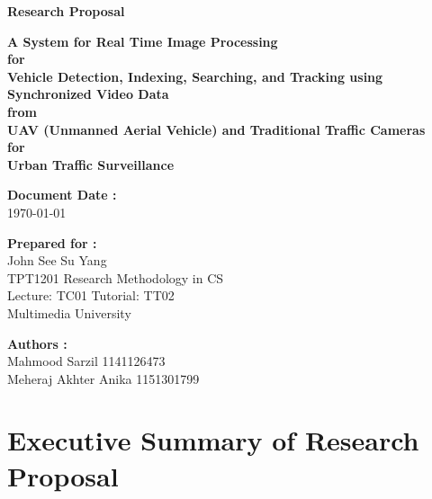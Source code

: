 \documentclass[12pt,a4paper,oneside]{article}
\begin{document}
 


\begin{titlepage}
	\null \vfill
   \begin{center}
    {\LARGE \textbf{Research Proposal}}
			\vspace{20mm}
			
			
			
			{\Large  \textbf{A System for Real Time Image Processing \\for 
            	\\Vehicle Detection, Indexing, Searching, and Tracking using 						Synchronized Video Data \\from \\UAV (Unmanned Aerial Vehicle)  and 				Traditional Traffic Cameras \\for \\Urban Traffic Surveillance }}
			\vspace{8mm}
			
			
   \end{center}
  	\vfill
		\vfill
		
		\begin{flushright}
			
			\textbf{Document Date :}\\
			\today
			\vspace{7mm}
			
			\textbf{Prepared for :}\\
            {\large John See Su Yang\\}
            TPT1201 Research Methodology in CS\\
            Lecture: TC01 Tutorial: TT02\\ 
            Multimedia University 
			\vspace{7mm}
			
			\textbf{Authors :}\\
			{\large Mahmood Sarzil 1141126473 \\
			 \large Meheraj Akhter Anika 1151301799 \\}
			
			
			
		\end{flushright}
		\hfill
			
		
\end{titlepage}
\tableofcontents
\newpage

\null
\section{Executive Summary of Research Proposal}
\end{document}
